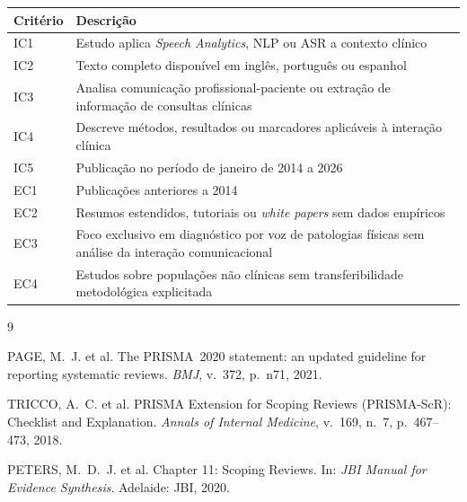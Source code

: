 \documentclass[12pt, a4paper]{article}
\begin{document}
\begin{longtable}{p{1.8cm} p{10.5cm}}
\toprule
\textbf{Critério} & \textbf{Descrição} \\
\midrule
\endhead
IC1 & Estudo aplica \textit{Speech Analytics}, NLP ou ASR a contexto clínico \\[0.4em]
IC2 & Texto completo disponível em inglês, português ou espanhol \\[0.4em]
IC3 & Analisa comunicação profissional-paciente ou extração de informação de
      consultas clínicas \\[0.4em]
IC4 & Descreve métodos, resultados ou marcadores aplicáveis à interação clínica \\[0.4em]
IC5 & Publicação no período de janeiro de 2014 a 2026 \\
\midrule
EC1 & Publicações anteriores a 2014 \\[0.4em]
EC2 & Resumos estendidos, tutoriais ou \textit{white papers} sem dados empíricos \\[0.4em]
EC3 & Foco exclusivo em diagnóstico por voz de patologias físicas sem análise
      da interação comunicacional \\[0.4em]
EC4 & Estudos sobre populações não clínicas sem transferibilidade metodológica
      explicitada \\
\bottomrule
\end{longtable}

\bigskip
\begin{thebibliography}{9}

PAGE, M.~J. et al.
The PRISMA~2020 statement: an updated guideline for reporting systematic
reviews.
\textit{BMJ}, v.~372, p.~n71, 2021.

TRICCO, A.~C. et al.
PRISMA Extension for Scoping Reviews (PRISMA-ScR): Checklist and
Explanation.
\textit{Annals of Internal Medicine}, v.~169, n.~7, p.~467--473, 2018.

PETERS, M.~D.~J. et al.
Chapter 11: Scoping Reviews.
In: \textit{JBI Manual for Evidence Synthesis}. Adelaide: JBI, 2020.

\end{thebibliography}
\end{document}
